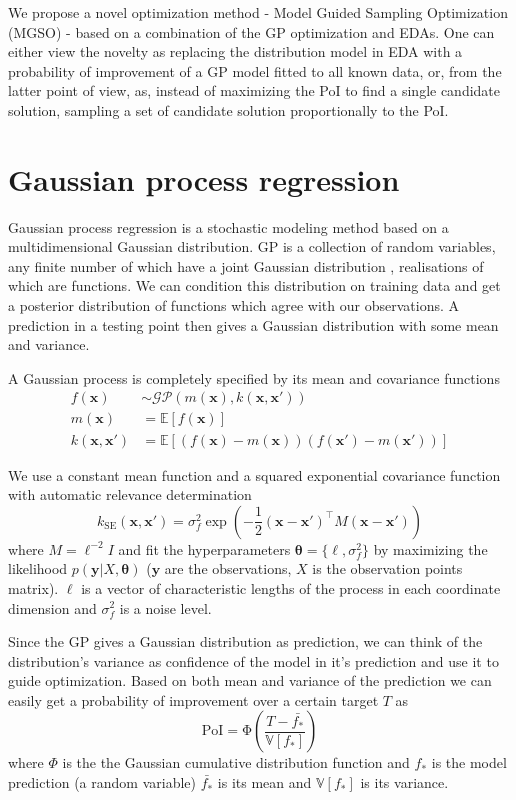 \documentclass{sig-alternate}
\newcommand{\xx}{\mathrm{\mathbf{x}}}
\newcommand{\yy}{\mathrm{\mathbf{y}}}
\newcommand{\ttheta}{\mathbf{\theta}}
\newcommand{\eell}{\boldsymbol\ell}
\begin{document}
We propose a novel optimization method - Model Guided Sampling Optimization (MGSO) - based on a combination of 
the GP optimization and EDAs. One can either view the novelty as replacing the distribution model in EDA with 
a probability of improvement of a GP model fitted to all known data, or, from the latter point of view, as, 
instead of maximizing the PoI to find a single candidate solution, sampling a set of candidate solution 
proportionally to the PoI. 

\section{Gaussian process regression}

Gaussian process regression is a stochastic modeling method based on a multidimensional Gaussian distribution. 
GP is a collection of random variables, any finite number of which have a joint Gaussian distribution 
\cite{rasmussen2006gaussian}, realisations of which are functions. We can condition this distribution on training 
data and get a posterior distribution of functions which agree with our observations. A prediction in a testing 
point then gives a Gaussian distribution with some mean and variance. 

A Gaussian process is completely specified by its mean and covariance functions
\begin{align*}
  f(\xx) &\sim \mathcal{GP}\left( m(\xx), k(\xx, \xx')\right) \\
  m(\xx) &= \mathbb{E} \left[ f(\xx) \right] \\
  k(\xx, \xx') &= \mathbb{E} \left[ (f(\xx) - m(\xx))(f(\xx') - m(\xx')) \right] 
\end{align*}

We use a constant mean function and a squared exponential covariance function with
automatic relevance determination
$$
  k_{\mathrm{SE}}(\xx, \xx') = \sigma_f^2 \exp\left( - \frac{1}{2} (\xx - \xx')^\top M (\xx - \xx') \right)
$$
where $ M = \eell^{-2}I $ and fit the hyperparameters $\ttheta = \{ \eell, \sigma_f^2 \}$ by 
maximizing the likelihood $p(\yy | X, \ttheta)$ ($\yy$ are the observations, $X$ is the observation 
points matrix). $\eell$ is a vector of characteristic lengths of the process in each coordinate dimension
and $\sigma_f^2$ is a noise level.

Since the GP gives a Gaussian distribution as prediction, we can think of the distribution's variance
as confidence of the model in it's prediction and use it to guide optimization. Based on both mean 
and variance of the prediction we can easily get a probability of improvement \cite{jones01taxonomy} over a 
certain target $T$ as
$$
 \mathrm{PoI} = \mathrm{\Phi}\left( \frac{T - \bar{f_*}}{\mathbb{V}[f_*]} \right)
$$
where $\Phi$ is the the Gaussian cumulative distribution function and $f_*$ is the model prediction (a random
variable) $\bar{f_*}$ is its mean and $\mathbb{V}[f_*]$ is its variance.
\end{document}
